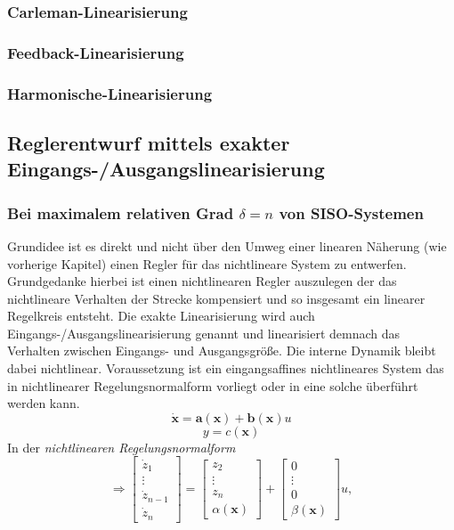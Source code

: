 		\subsubsection{Carleman-Linearisierung}
		\subsubsection{Feedback-Linearisierung}
		\subsubsection{Harmonische-Linearisierung}
	\subsection{Reglerentwurf mittels exakter Eingangs-/Ausgangslinearisierung}
		\subsubsection{Bei maximalem relativen Grad $ \delta=n $ von SISO-Systemen}
			Grundidee ist es direkt und nicht über den Umweg einer linearen Näherung (wie vorherige Kapitel) einen Regler für das nichtlineare System zu entwerfen. Grundgedanke hierbei ist einen nichtlinearen Regler auszulegen der das nichtlineare Verhalten der Strecke kompensiert und so insgesamt ein linearer Regelkreis entsteht. Die exakte Linearisierung wird auch Eingangs-/Ausgangslinearisierung genannt und linearisiert demnach das Verhalten zwischen Eingangs- und Ausgangsgröße. Die interne Dynamik bleibt dabei nichtlinear.  Voraussetzung ist ein eingangsaffines nichtlineares System das in nichtlinearer Regelungsnormalform vorliegt oder in eine solche überführt werden kann.
			\[\bm{\dot{x}} = \bm{a(x)} + \bm{b(x)}u \]
			\[y=c(\bm{x})\]
			In der \textit{nichtlinearen Regelungsnormalform} 
		 	\[\Rightarrow\begin{bmatrix}\dot{z}_{1}\\\vdots\\\dot{z}_{n-1}\\ \dot{z}_{n}\end{bmatrix} = \begin{bmatrix}z_{2}\\\vdots\\ z_{n}\\\alpha(\bm{x})\end{bmatrix}+\begin{bmatrix}0\\\vdots\\ 0\\\beta(\bm{x})\end{bmatrix}u,\]
